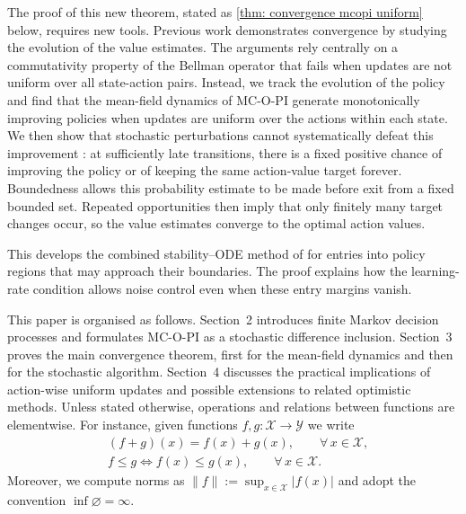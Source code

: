 \documentclass[twoside,11pt]{article}
\newcommand{\xset}{\mathcal{X}}
\DeclareRobustCommand{\reviewbarstart}{%
  \ifhmode %
    \vadjust{\vbox to 0pt{%
      \vskip-\ht\strutbox %
      \vskip-\dp\strutbox %
      \cbstart[\changebarwidth] %
      \vss %
    }}%
  \else %
    \cbstart[\changebarwidth]%
  \fi %
} %
\providecommand{\DIFadd}[1]{#1} %
\providecommand{\DIFaddbegin}{\reviewbarstart} %
\providecommand{\DIFaddend}{\protect\cbend} %
\def\DIFadd#1{#1}%
\def\DIFaddbegin{}%
\def\DIFaddend{}%
\begin{document}
The proof of this new theorem, stated as \autoref{thm: convergence mcopi uniform} below, requires new tools. 
Previous work demonstrates convergence by studying the evolution of the value estimates. The arguments rely centrally on a commutativity property of the Bellman operator that fails when updates are not uniform over all state-action pairs.
Instead, we track the evolution of the policy and find that the mean-field dynamics of MC-O-PI generate monotonically improving policies when updates are uniform over the actions within each state.
We then show that stochastic perturbations cannot systematically defeat this improvement \DIFaddbegin \DIFadd{: at sufficiently late transitions, there is }\DIFaddend a fixed positive  \DIFaddbegin \DIFadd{chance of improving the policy or of keeping the same action-value target forever. Boundedness allows this probability estimate to be made before exit from a fixed bounded set. Repeated opportunities then imply that only finitely many target changes occur, so the value estimates }\DIFaddend converge to the  optimal action values.

This \DIFaddbegin \DIFadd{develops the combined stability--ODE method of \citet[Section~5.4]{Kushner2003StochasticApplications} for entries into policy regions that may approach their boundaries. The proof explains how the learning-rate condition allows noise control even when these entry margins vanish.
}

\DIFadd{This }\DIFaddend paper is organised as follows. Section~2 introduces finite Markov decision
processes and formulates MC-O-PI as a stochastic difference inclusion. Section~3 proves the
main convergence theorem, first for the mean-field dynamics and then for the stochastic
algorithm. Section~4 discusses the practical implications of action-wise uniform updates
and possible extensions to related optimistic methods. 
Unless stated otherwise, operations and relations between functions are elementwise. For instance, given functions $f, g : \mathcal X \to \mathcal Y$ we write
\begin{align*}
&(f + g)(x) = f(x) + g(x), \qquad \forall \, x \in \xset ,
    \\
&f \le g \iff f(x) \le g(x), \qquad \forall \, x \in \xset .
\end{align*}
Moreover, we compute norms as $\|f\| := \sup_{x \in \xset} |f(x)|$ 
and adopt the convention $\inf \varnothing = \infty$.
\end{document}
